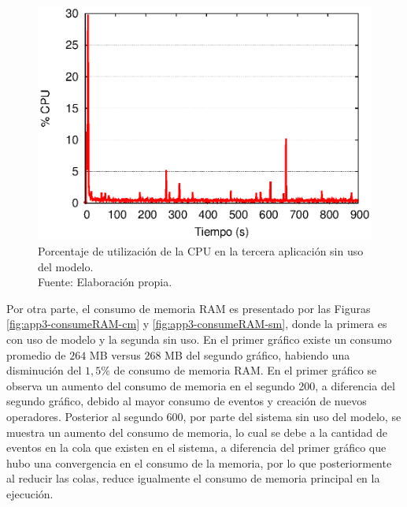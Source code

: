 \begin{figure}[!ht]
	\centering
	\captionsetup{justification=centering}
    \includegraphics[scale=0.65]{images/exp/app3/sm/fisical/consumeCPU.eps}
    \caption[Porcentaje de utilizaci\'on de la CPU en la tercera aplicaci\'on sin uso del modelo.]{Porcentaje de utilizaci\'on de la CPU en la tercera aplicaci\'on sin uso del modelo.\\Fuente: Elaboraci\'on propia.}
    \label{fig:app3-consumeCPU-sm}
\end{figure}


Por otra parte, el consumo de memoria RAM es presentado por las Figuras \ref{fig:app3-consumeRAM-cm} y \ref{fig:app3-consumeRAM-sm}, donde la primera es con uso de modelo y la segunda sin uso. En el primer gr\'afico existe un consumo promedio de $264$ MB versus $268$ MB del segundo gr\'afico, habiendo una disminuci\'on del $1,5\%$ de consumo de memoria RAM. En el primer gr\'afico se observa un aumento del consumo de memoria en el segundo 200, a diferencia del segundo gr\'afico, debido al mayor consumo de eventos y creaci\'on de nuevos operadores. Posterior al segundo 600, por parte del sistema sin uso del modelo, se muestra un aumento del consumo de memoria, lo cual se debe a la cantidad de eventos en la cola que existen en el sistema, a diferencia del primer gr\'afico que hubo una convergencia en el consumo de la memoria, por lo que posteriormente al reducir las colas, reduce igualmente el consumo de memoria principal en la ejecuci\'on.

